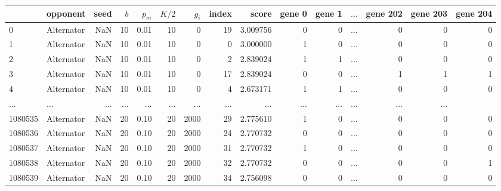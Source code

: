 \begin{tabular}{llrrrrrrrrrrrrr}
\toprule
{} &    opponent &  seed &  $b$ &  $p_m$ &  $K/2$ &  $g_i$ &  index &     score &  gene 0 &  gene 1 &  \(\dots\) &   gene 202 &  gene 203 &  gene 204 \\
\midrule
0       &  Alternator &   NaN &   10 &   0.01 &     10 &      0 &     19 &  3.009756 &       0 &       0  & \(\dots\) &      0 &         0 &         0 \\
1       &  Alternator &   NaN &   10 &   0.01 &     10 &      0 &      0 &  3.000000 &       1 &       0  & \(\dots\) &      0 &         0 &         0 \\
2       &  Alternator &   NaN &   10 &   0.01 &     10 &      0 &      2 &  2.839024 &       1 &       1  & \(\dots\) &      0 &         0 &         0 \\
3       &  Alternator &   NaN &   10 &   0.01 &     10 &      0 &     17 &  2.839024 &       0 &       0  & \(\dots\) &      1 &         1 &         1 \\
4       &  Alternator &   NaN &   10 &   0.01 &     10 &      0 &      4 &  2.673171 &       1 &       1  & \(\dots\) &      0 &         0 &         0 \\
\(\dots\)  &  \(\dots\)  &   \(\dots\)  &   \(\dots\)  & \(\dots\)  &  \(\dots\)  & \(\dots\)          & \(\dots\) &       \(\dots\)  &       \(\dots\)  &  \(\dots\)    & \(\dots\)  &         \(\dots\)  &         \(\dots\)  \\
1080535 &  Alternator &   NaN &   20 &   0.10 &     20 &   2000 &     29 &  2.775610 &       1 &       0  & \(\dots\) &      0 &         0 &         0 \\
1080536 &  Alternator &   NaN &   20 &   0.10 &     20 &   2000 &     24 &  2.770732 &       0 &       0  & \(\dots\) &      0 &         0 &         0 \\
1080537 &  Alternator &   NaN &   20 &   0.10 &     20 &   2000 &     31 &  2.770732 &       1 &       0  & \(\dots\) &      0 &         0 &         0 \\
1080538 &  Alternator &   NaN &   20 &   0.10 &     20 &   2000 &     32 &  2.770732 &       0 &       0  & \(\dots\) &      0 &         0 &         1 \\
1080539 &  Alternator &   NaN &   20 &   0.10 &     20 &   2000 &     34 &  2.756098 &       0 &       0  & \(\dots\) &      0 &         0 &         0 \\
\bottomrule
\end{tabular}
